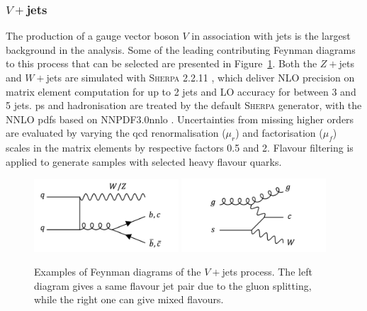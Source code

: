 \subsubsection{$V+$jets}
The production of a gauge vector boson $V$ in association with jets is the largest background in the analysis. Some of the leading contributing Feynman diagrams to this process that can be selected are presented in Figure~\ref{fig:feynVJ}. Both the $Z+$jets and $W+$jets are simulated with \textsc{Sherpa} 2.2.11 \cite{10.21468/SciPostPhys.7.3.034}, which deliver NLO precision on matrix element computation for up to 2 jets and LO accuracy for between 3 and 5 jets. \gls{ps} and hadronisation are treated by the default \textsc{Sherpa} generator, with the NNLO \gls{pdf}s based on NNPDF3.0nnlo \cite{PDFLHCrun2}. Uncertainties from missing higher orders are evaluated by varying the \gls{qcd} renormalisation ($\mu_r$) and factorisation ($\mu_f$) scales in the matrix elements by respective factors 0.5 and 2. Flavour filtering is applied to generate samples with selected heavy flavour quarks.

\begin{figure}[h!]
  \center
  \includegraphics[width=0.48\textwidth]{Images/VH/Feynman/vjet.png}
  \includegraphics[width=0.48\textwidth]{Images/VH/Feynman/vjet2.png}
  \caption{Examples of Feynman diagrams of the $V+$jets process. The left diagram gives a same flavour jet pair due to the gluon splitting, while the right one can give mixed flavours.} 
  \label{fig:feynVJ}
\end{figure}

